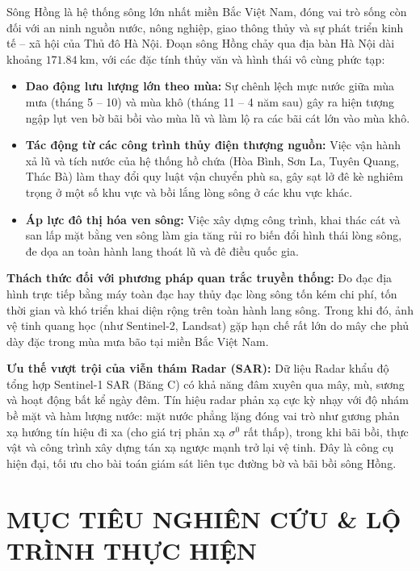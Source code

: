 \documentclass[11pt,a4paper]{article}
\begin{document}
Sông Hồng là hệ thống sông lớn nhất miền Bắc Việt Nam, đóng vai trò sống còn đối với an ninh nguồn nước, nông nghiệp, giao thông thủy và sự phát triển kinh tế -- xã hội của Thủ đô Hà Nội. Đoạn sông Hồng chảy qua địa bàn Hà Nội dài khoảng $171.84~\text{km}$, với các đặc tính thủy văn và hình thái vô cùng phức tạp:
\begin{itemize}
    \item \textbf{Dao động lưu lượng lớn theo mùa:} Sự chênh lệch mực nước giữa mùa mưa (tháng 5 -- 10) và mùa khô (tháng 11 -- 4 năm sau) gây ra hiện tượng ngập lụt ven bờ bãi bồi vào mùa lũ và làm lộ ra các bãi cát lớn vào mùa khô.
    \item \textbf{Tác động từ các công trình thủy điện thượng nguồn:} Việc vận hành xả lũ và tích nước của hệ thống hồ chứa (Hòa Bình, Sơn La, Tuyên Quang, Thác Bà) làm thay đổi quy luật vận chuyển phù sa, gây sạt lở đê kè nghiêm trọng ở một số khu vực và bồi lắng lòng sông ở các khu vực khác.
    \item \textbf{Áp lực đô thị hóa ven sông:} Việc xây dựng công trình, khai thác cát và san lấp mặt bằng ven sông làm gia tăng rủi ro biến đổi hình thái lòng sông, đe dọa an toàn hành lang thoát lũ và đê điều quốc gia.
\end{itemize}

\textbf{Thách thức đối với phương pháp quan trắc truyền thống:} Đo đạc địa hình trực tiếp bằng máy toàn đạc hay thủy đạc lòng sông tốn kém chi phí, tốn thời gian và khó triển khai diện rộng trên toàn hành lang sông. Trong khi đó, ảnh vệ tinh quang học (như Sentinel-2, Landsat) gặp hạn chế rất lớn do mây che phủ dày đặc trong mùa mưa bão tại miền Bắc Việt Nam.

\textbf{Ưu thế vượt trội của viễn thám Radar (SAR):} Dữ liệu Radar khẩu độ tổng hợp Sentinel-1 SAR (Băng C) có khả năng đâm xuyên qua mây, mù, sương và hoạt động bất kể ngày đêm. Tín hiệu radar phản xạ cực kỳ nhạy với độ nhám bề mặt và hàm lượng nước: mặt nước phẳng lặng đóng vai trò như gương phản xạ hướng tín hiệu đi xa (cho giá trị phản xạ $\sigma^0$ rất thấp), trong khi bãi bồi, thực vật và công trình xây dựng tán xạ ngược mạnh trở lại vệ tinh. Đây là công cụ hiện đại, tối ưu cho bài toán giám sát liên tục đường bờ và bãi bồi sông Hồng.

\section{MỤC TIÊU NGHIÊN CỨU \& LỘ TRÌNH THỰC HIỆN}
\end{document}
